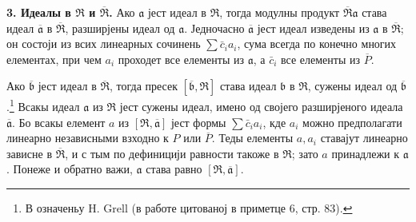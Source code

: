 \documentclass[11pt]{article}
\begin{document}
\setcounter{footnote}{14}

\textbf{3. Идеалы в $\mathfrak R$ и $\overline{\mathfrak R}$.} Ако $\mathfrak a$ јест идеал в $\mathfrak R$, тогда модулны продукт $\overline{\mathfrak R}\mathfrak a$ става идеал $\overline{\mathfrak a}$ в $\overline{\mathfrak R}$, разширјены идеал од $\mathfrak a$. Једночасно $\overline{\mathfrak a}$ јест идеал изведены из $\mathfrak a$ в $\overline{\mathfrak R}$; он состоји из всих линеарных сочинень $\sum \bar c_i a_i$, сума всегда по конечно многих елементах, при чем $a_i$ проходет все елементы из $\mathfrak a$, а $\bar c_i$ все елементы из $\overline P$.

Ако $\overline{\mathfrak b}$ јест идеал в $\overline{\mathfrak R}$, тогда пресек $[\overline{\mathfrak b},\mathfrak R]$ става идеал $\mathfrak b$ в $\mathfrak R$, сужены идеал од $\overline{\mathfrak b}$.\footnote{В означеньу H. Grell (в работе цитованој в приметце 6, стр. 83).} Всакы идеал $\mathfrak a$ из $\mathfrak R$ јест сужены идеал, имено од својего разширјеного идеала $\overline{\mathfrak a}$. Бо всакы елемент $a$ из $[\mathfrak R,\overline{\mathfrak a}]$ јест формы $\sum \bar c_i a_i$, кде $a_i$ можно предполагати линеарно независными взходно к $P$ или $\overline P$. Теды елементы $a,a_i$ ставајут линеарно зависне в $\overline{\mathfrak R}$, и с тым по дефиницији равности такоже в $\mathfrak R$; зато $a$ принадлежи к $\mathfrak a$. Понеже и обратно важи, $\mathfrak a$ става равно $[\mathfrak R,\overline{\mathfrak a}]$.
\end{document}
